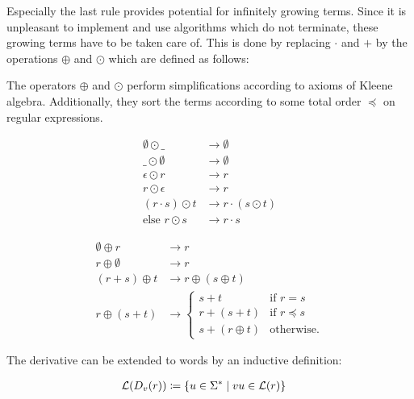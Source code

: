 Especially the last rule provides potential for infinitely growing terms.
Since it is unpleasant to implement and use algorithms which do not terminate,
these growing terms have to be taken care of.
This is done by replacing $\cdot$ and $+$ by the operations $\oplus$ and $\odot$
which are defined as follows:

\begin{definition}
    The operators $\oplus$ and $\odot$ perform simplifications according to axioms of Kleene algebra.
    Additionally, they sort the terms according to some total order $\preceq$ on regular expressions.

    \begin{align}
        \emptyset \odot \_     &\rightarrow \emptyset \\
        \_ \odot \emptyset     &\rightarrow \emptyset \\
        \epsilon \odot r       &\rightarrow r \\
        r \odot \epsilon       &\rightarrow r \\
        (r \cdot s) \odot t    &\rightarrow r \cdot (s \odot t) \\
        \text{else } r \odot s &\rightarrow r \cdot s
    \end{align}

    \begin{align}
        \emptyset \oplus r &\rightarrow r \\
        r \oplus \emptyset &\rightarrow r \\
        (r + s) \oplus t   &\rightarrow r \oplus (s \oplus t) \\
        r \oplus (s + t)   &\rightarrow
        \begin{cases}
            s + t            & \text{if } r = s \\
            r + (s + t)      & \text{if } r \preceq s \\
            s + (r \oplus t) & \text{otherwise}.
        \end{cases}
    \end{align}
\end{definition}

\begin{definition}
    The derivative can be extended to words by an inductive definition:

    \begin{align}
        \label{def:derivative_wrt_words}
        \mathcal{L}(D_v(r)) &\coloneqq \{ u \in \Sigma^\ast \mid v u \in \mathcal{L}(r) \}
    \end{align}
\end{definition}

